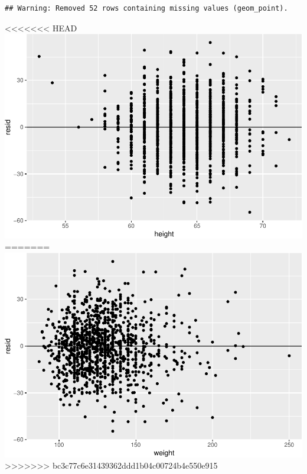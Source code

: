 \documentclass[]{article}
\newenvironment{Shaded}{\begin{snugshade}}{\end{snugshade}}
\newcommand{\DataTypeTok}[1]{\textcolor[rgb]{0.13,0.29,0.53}{#1}}
\newcommand{\KeywordTok}[1]{\textcolor[rgb]{0.13,0.29,0.53}{\textbf{#1}}}
\newcommand{\NormalTok}[1]{#1}
\newcommand{\OperatorTok}[1]{\textcolor[rgb]{0.81,0.36,0.00}{\textbf{#1}}}
\newcommand{\StringTok}[1]{\textcolor[rgb]{0.31,0.60,0.02}{#1}}
\begin{document}
\begin{verbatim}
## Warning: Removed 52 rows containing missing values (geom_point).
\end{verbatim}

<<<<<<< HEAD
\includegraphics{lab-8-regression_files/figure-latex/unnamed-chunk-21-1.pdf}
=======
\includegraphics{lab-8-regression_files/figure-latex/unnamed-chunk-22-1.pdf}
>>>>>>> bc3c77c6e31439362ddd1b04c00724b4e550e915

\begin{Shaded}
\end{Shaded}
\end{document}
